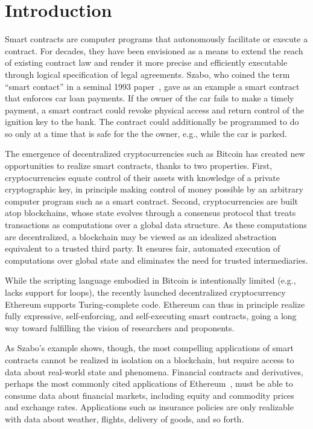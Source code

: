 \section{Introduction}

Smart contracts are computer programs that autonomously facilitate or execute a contract. For decades, they have been envisioned as a means to extend the reach of existing contract law and render it more precise and efficiently executable through logical specification of legal agreements. Szabo, who coined the term ``smart contact'' in a seminal 1993 paper~\cite{}, gave as an example a smart contract that enforces car loan payments. If the owner of the car fails to make a timely payment, a smart contract could revoke physical access and return control of the ignition key to the bank. The contract could additionally be programmed to do so only at a time that is safe for the the owner, e.g., while the car is parked.

The emergence of decentralized cryptocurrencies such as Bitcoin has created new opportunities to realize smart contracts, thanks to two properties. First, cryptocurrencies equate control of their assets with knowledge of a private cryptographic key, in principle making control of money possible by an arbitrary computer program such as a smart contract. Second, cryptocurrencies are built atop blockchains, whose state evolves through a consensus protocol that treats transactions as computations over a global data structure. As these computations are decentralized, a blockchain may be viewed as an idealized abstraction equivalent to a trusted third party. It ensures fair, automated execution of computations over global state and eliminates the need for trusted intermediaries. 

While the scripting language embodied in Bitcoin is intentionally limited (e.g., lacks support for loops), the recently launched decentralized cryptocurrency Ethereum supports Turing-complete code. Ethereum can thus in principle realize fully expressive, self-enforcing, and self-executing smart contracts, going a long way toward fulfilling the vision of researchers and proponents.  

As Szabo's example shows, though, the most compelling applications of smart contracts cannot be realized in isolation on a blockchain, but require access to data about real-world state and phenomena. Financial contracts and derivatives, perhaps the most commonly cited applications of Ethereum~\cite{}, must be able to consume data about financial markets, including equity and commodity prices and exchange rates. Applications such as insurance policies are only realizable with data about weather, flights, delivery of goods, and so forth. 

